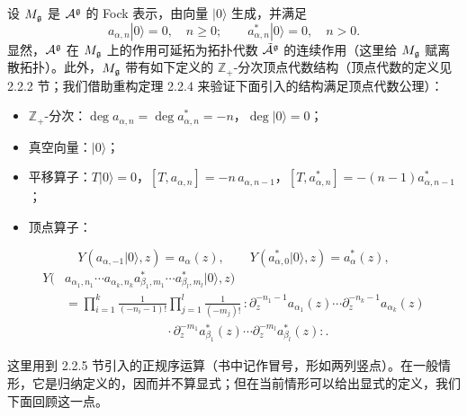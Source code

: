 设 $M_{\mathfrak{g}}$ 是 $\mathcal{A}^{\mathfrak{g}}$ 的 Fock 表示，由向量 $|0\rangle$ 生成，并满足
\[
a_{\alpha,n}|0\rangle = 0,\quad n\ge 0;\qquad a^*_{\alpha,n}|0\rangle = 0,\quad n>0.
\]
显然，$\mathcal{A}^{\mathfrak{g}}$ 在 $M_{\mathfrak{g}}$ 上的作用可延拓为拓扑代数 $\tilde{\mathcal{A}}^{\mathfrak{g}}$ 的连续作用（这里给 $M_{\mathfrak{g}}$ 赋离散拓扑）。此外，$M_{\mathfrak{g}}$ 带有如下定义的 $\mathbb{Z}_+$-分次顶点代数结构（顶点代数的定义见 2.2.2 节；我们借助重构定理 2.2.4 来验证下面引入的结构满足顶点代数公理）：

\begin{itemize}
    \item $\mathbb{Z}_+$-分次：$\deg a_{\alpha,n} = \deg a^*_{\alpha,n} = -n$，$\deg |0\rangle = 0$；
    \item 真空向量：$|0\rangle$；
    \item 平移算子：$T|0\rangle = 0$，$[T,a_{\alpha,n}] = -n\,a_{\alpha,n-1}$，$[T,a^*_{\alpha,n}] = -(n-1)a^*_{\alpha,n-1}$；
    \item 顶点算子：
\end{itemize}
\[
Y(a_{\alpha,-1}|0\rangle,z) = a_\alpha(z), \qquad Y(a^*_{\alpha,0}|0\rangle,z) = a^*_\alpha(z),
\]
\[
\begin{aligned}
Y(&a_{\alpha_1,n_1}\cdots a_{\alpha_k,n_k}a^*_{\beta_1,m_1}\cdots a^*_{\beta_l,m_l}|0\rangle,z)\\
&= \prod_{i=1}^{k}\frac{1}{(-n_i-1)!}\prod_{j=1}^{l}\frac{1}{(-m_j)!}\,
{:}\partial_z^{-n_1-1}a_{\alpha_1}(z)\cdots\partial_z^{-n_k-1}a_{\alpha_k}(z)\\
&\qquad\qquad\qquad\qquad\cdot\partial_z^{-m_1}a^*_{\beta_1}(z)\cdots\partial_z^{-m_l}a^*_{\beta_l}(z){:}.
\end{aligned}
\]

这里用到 2.2.5 节引入的正规序运算（书中记作冒号，形如两列竖点）。在一般情形，它是归纳定义的，因而并不算显式；但在当前情形可以给出显式的定义，我们下面回顾这一点。


